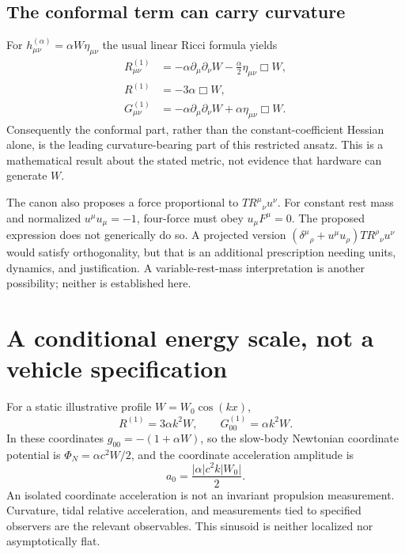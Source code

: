 \documentclass[11pt]{article}
\newcommand{\Boxop}{\mathop{\Box}}
\begin{document}
\subsection{The conformal term can carry curvature}
For $h^{(\alpha)}_{\mu\nu}=\alpha W\eta_{\mu\nu}$ the usual linear Ricci formula yields
\begin{align}
 R^{(1)}_{\mu\nu}&=-\alpha\partial_\mu\partial_\nu W
                        -\tfrac{\alpha}{2}\eta_{\mu\nu}\Boxop W,\\
 R^{(1)}&=-3\alpha\Boxop W,\\
 G^{(1)}_{\mu\nu}&=-\alpha\partial_\mu\partial_\nu W
                         +\alpha\eta_{\mu\nu}\Boxop W.
\end{align}
Consequently the conformal part, rather than the constant-coefficient Hessian alone, is the leading curvature-bearing part of this restricted ansatz. This is a mathematical result about the stated metric, not evidence that hardware can generate $W$.

The canon also proposes a force proportional to $T R^\mu{}_{\nu}u^\nu$. For constant rest mass and normalized $u^\mu u_\mu=-1$, four-force must obey $u_\mu F^\mu=0$. The proposed expression does not generically do so. A projected version $(\delta^\mu{}_{\rho}+u^\mu u_\rho)T R^\rho{}_{\nu}u^\nu$ would satisfy orthogonality, but that is an additional prescription needing units, dynamics, and justification. A variable-rest-mass interpretation is another possibility; neither is established here.
\newpage
\section{A conditional energy scale, not a vehicle specification}
For a static illustrative profile $W=W_0\cos(kx)$,
\begin{equation}
 R^{(1)}=3\alpha k^2W,\qquad G^{(1)}_{00}=\alpha k^2W.
\end{equation}
In these coordinates $g_{00}=-(1+\alpha W)$, so the slow-body Newtonian coordinate potential is $\Phi_N=\alpha c^2W/2$, and the coordinate acceleration amplitude is
\begin{equation}
 a_0=\frac{|\alpha|c^2k|W_0|}{2}.
\end{equation}
An isolated coordinate acceleration is not an invariant propulsion measurement. Curvature, tidal relative acceleration, and measurements tied to specified observers are the relevant observables. This sinusoid is neither localized nor asymptotically flat.
\end{document}
